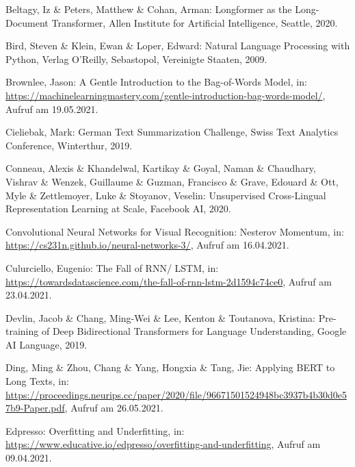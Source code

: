 \setcounter{page}{104}

\begin{thebibliography}{104}
\thispagestyle{fancy}

Beltagy, Iz \& Peters, Matthew \& Cohan, Arman: Longformer as the Long-Document Transformer, Allen Institute for Artificial Intelligence, Seattle, 2020.

Bird, Steven \& Klein, Ewan \& Loper, Edward: Natural Language Processing with Python, Verlag O'Reilly, Sebastopol, Vereinigte Staaten, 2009.

Brownlee, Jason: A Gentle Introduction to the Bag-of-Words Model, in: \url{https://machinelearningmastery.com/gentle-introduction-bag-words-model/}, Aufruf am 19.05.2021.

Cieliebak, Mark: German Text Summarization Challenge, Swiss Text Analytics Conference, Winterthur, 2019.

Conneau, Alexis \& Khandelwal, Kartikay \& Goyal, Naman \& Chaudhary, Vishrav \& Wenzek, Guillaume \& Guzman, Francisco \& Grave, Edouard \& Ott, Myle \& Zettlemoyer, Luke \& Stoyanov, Veselin: Unsupervised Cross-Lingual Representation Learning at Scale, Facebook AI, 2020.

Convolutional Neural Networks for Visual Recognition: Nesterov Momentum, in: \url{https://cs231n.github.io/neural-networks-3/}, Aufruf am 16.04.2021.

Culurciello, Eugenio: The Fall of RNN/ LSTM, in: \url{https://towardsdatascience.com/the-fall-of-rnn-lstm-2d1594c74ce0}, Aufruf am 23.04.2021.

Devlin, Jacob \& Chang, Ming-Wei \& Lee, Kenton \& Toutanova, Kristina: Pre-training of Deep Bidirectional Transformers for
Language Understanding, Google AI Language, 2019.

Ding, Ming \& Zhou, Chang \& Yang, Hongxia \& Tang, Jie: Applying BERT to Long Texts, in: \url{https://proceedings.neurips.cc/paper/2020/file/96671501524948bc3937b4b30d0e57b9-Paper.pdf}, Aufruf am 26.05.2021.

Edpresso: Overfitting and Underfitting, in: \url{https://www.educative.io/edpresso/overfitting-and-underfitting}, Aufruf am 09.04.2021.


\end{thebibliography}
